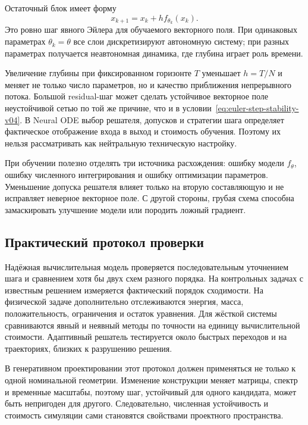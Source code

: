Остаточный блок имеет форму
\begin{equation}
\label{eq:resnet-euler-v04}
x_{k+1}=x_k+h f_{\theta_k}(x_k).
\end{equation}
Это ровно шаг явного Эйлера для обучаемого векторного поля. При одинаковых параметрах $\theta_k=\theta$ все слои дискретизируют автономную систему; при разных параметрах получается неавтономная динамика, где глубина играет роль времени.

\begin{mlconnection}
Увеличение глубины при фиксированном горизонте $T$ уменьшает $h=T/N$ и меняет не только число параметров, но и качество приближения непрерывного потока. Большой residual-шаг может сделать устойчивое векторное поле неустойчивой сетью по той же причине, что и в условии~\eqref{eq:euler-step-stability-v04}. В Neural ODE выбор решателя, допусков и стратегии шага определяет фактическое отображение входа в выход и стоимость обучения. Поэтому их нельзя рассматривать как нейтральную техническую настройку.
\end{mlconnection}

При обучении полезно отделять три источника расхождения: ошибку модели $f_\theta$, ошибку численного интегрирования и ошибку оптимизации параметров. Уменьшение допуска решателя влияет только на вторую составляющую и не исправляет неверное векторное поле. С другой стороны, грубая схема способна замаскировать улучшение модели или породить ложный градиент.

\subsection{Практический протокол проверки}

Надёжная вычислительная модель проверяется последовательным уточнением шага и сравнением хотя бы двух схем разного порядка. На контрольных задачах с известным решением измеряется фактический порядок сходимости. На физической задаче дополнительно отслеживаются энергия, масса, положительность, ограничения и остаток уравнения. Для жёсткой системы сравниваются явный и неявный методы по точности на единицу вычислительной стоимости. Адаптивный решатель тестируется около быстрых переходов и на траекториях, близких к разрушению решения.

В генеративном проектировании этот протокол должен применяться не только к одной номинальной геометрии. Изменение конструкции меняет матрицы, спектр и временные масштабы, поэтому шаг, устойчивый для одного кандидата, может быть непригоден для другого. Следовательно, численная устойчивость и стоимость симуляции сами становятся свойствами проектного пространства.

